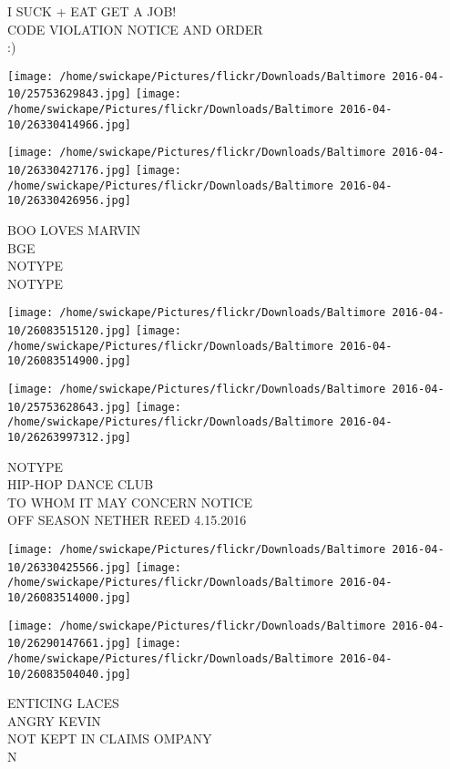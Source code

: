 \documentclass[10pt,letterpaper]{article}
\begin{document}
I SUCK + EAT GET A JOB!\\
CODE VIOLATION NOTICE AND ORDER\\
:)\\
\pagebreak

\texttt{[image: /home/swickape/Pictures/flickr/Downloads/Baltimore 2016-04-10/25753629843.jpg]}
\texttt{[image: /home/swickape/Pictures/flickr/Downloads/Baltimore 2016-04-10/26330414966.jpg]}

\texttt{[image: /home/swickape/Pictures/flickr/Downloads/Baltimore 2016-04-10/26330427176.jpg]}
\texttt{[image: /home/swickape/Pictures/flickr/Downloads/Baltimore 2016-04-10/26330426956.jpg]}

BOO LOVES MARVIN\\
BGE\\
NOTYPE\\
NOTYPE\\
\pagebreak

\texttt{[image: /home/swickape/Pictures/flickr/Downloads/Baltimore 2016-04-10/26083515120.jpg]}
\texttt{[image: /home/swickape/Pictures/flickr/Downloads/Baltimore 2016-04-10/26083514900.jpg]}

\texttt{[image: /home/swickape/Pictures/flickr/Downloads/Baltimore 2016-04-10/25753628643.jpg]}
\texttt{[image: /home/swickape/Pictures/flickr/Downloads/Baltimore 2016-04-10/26263997312.jpg]}

NOTYPE\\
HIP{-}HOP DANCE CLUB\\
TO WHOM IT MAY CONCERN NOTICE\\
OFF SEASON NETHER REED 4.15.2016\\
\pagebreak

\texttt{[image: /home/swickape/Pictures/flickr/Downloads/Baltimore 2016-04-10/26330425566.jpg]}
\texttt{[image: /home/swickape/Pictures/flickr/Downloads/Baltimore 2016-04-10/26083514000.jpg]}

\texttt{[image: /home/swickape/Pictures/flickr/Downloads/Baltimore 2016-04-10/26290147661.jpg]}
\texttt{[image: /home/swickape/Pictures/flickr/Downloads/Baltimore 2016-04-10/26083504040.jpg]}

ENTICING LACES\\
ANGRY KEVIN\\
NOT KEPT IN CLAIMS OMPANY\\
N\\
\pagebreak
\end{document}

